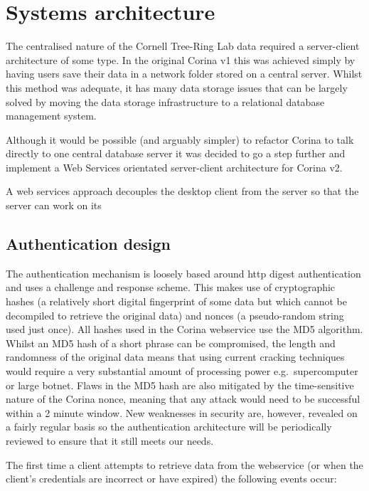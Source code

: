 
\chapter{Systems architecture}
The centralised nature of the Cornell Tree-Ring Lab data required a server-client architecture of some type. In the original Corina v1 this was achieved simply by having users save their data in a network folder stored on a central server. Whilst this method was adequate, it has many data storage issues that can be largely solved by moving the data storage infrastructure to a relational database management system.  

Although it would be possible (and arguably simpler) to refactor Corina to talk directly to one central database server it was decided to go a step further and implement a Web Services orientated server-client architecture for Corina v2.  

A web services approach decouples the desktop client from the server so that the server can work on its 

\section{Authentication design}
\label{txt:authentication}
The authentication mechanism is loosely based around http digest authentication and uses a challenge and response scheme. This makes use of cryptographic hashes (a relatively short digital fingerprint of some data but which cannot be decompiled to retrieve the original data) and nonces (a pseudo-random string used just once). All hashes used in the Corina webservice use the MD5 algorithm. Whilst an MD5 hash of a short phrase can be compromised, the length and randomness of the original data means that using current cracking techniques would require a very substantial amount of processing power e.g.\ supercomputer or large botnet.  Flaws in the MD5 hash are also mitigated by the time-sensitive nature of the Corina nonce, meaning that any attack would need to be successful within a 2 minute window.  New weaknesses in security are, however, revealed on a fairly regular basis so the authentication architecture will be periodically reviewed to ensure that it still meets our needs. 

The first time a client attempts to retrieve data from the webservice (or when the client's credentials are incorrect or have expired) the following events occur:


